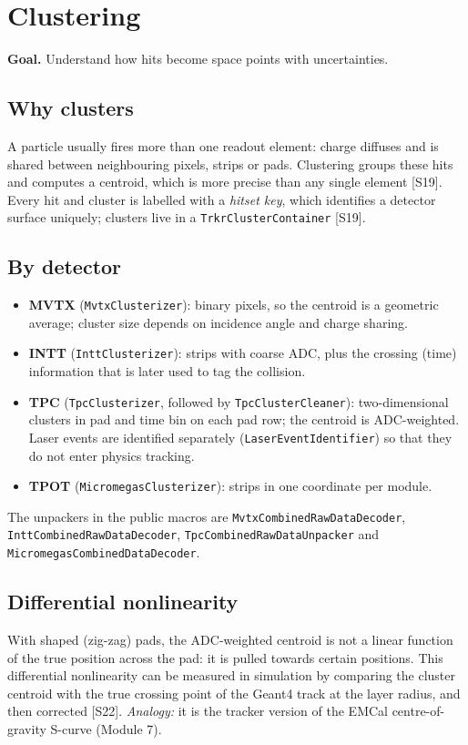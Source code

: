 \documentclass[11pt,letterpaper]{article}
\newcommand{\goal}[1]{\par\noindent\textbf{Goal.} #1\par}
\begin{document}
\section{Clustering}\label{sec:clus}
\goal{Understand how hits become space points with uncertainties.}

\subsection{Why clusters}
A particle usually fires more than one readout element: charge diffuses and is shared between neighbouring pixels, strips or pads.
Clustering groups these hits and computes a centroid, which is more precise than any single element [S19].
Every hit and cluster is labelled with a \emph{hitset key}, which identifies a detector surface uniquely; clusters live in a \texttt{TrkrClusterContainer} [S19].

\subsection{By detector}
\begin{itemize}
\item \textbf{MVTX} (\texttt{MvtxClusterizer}): binary pixels, so the centroid is a geometric average; cluster size depends on incidence angle and charge sharing.
\item \textbf{INTT} (\texttt{InttClusterizer}): strips with coarse ADC, plus the crossing (time) information that is later used to tag the collision.
\item \textbf{TPC} (\texttt{TpcClusterizer}, followed by \texttt{TpcClusterCleaner}): two-dimensional clusters in pad and time bin on each pad row; the centroid is ADC-weighted. Laser events are identified separately (\texttt{LaserEventIdentifier}) so that they do not enter physics tracking.
\item \textbf{TPOT} (\texttt{MicromegasClusterizer}): strips in one coordinate per module.
\end{itemize}
The unpackers in the public macros are \texttt{MvtxCombinedRawDataDecoder}, \texttt{InttCombinedRawDataDecoder}, \texttt{TpcCombinedRawDataUnpacker} and \texttt{MicromegasCombinedDataDecoder}.

\subsection{Differential nonlinearity}
With shaped (zig-zag) pads, the ADC-weighted centroid is not a linear function of the true position across the pad: it is pulled towards certain positions.
This differential nonlinearity can be measured in simulation by comparing the cluster centroid with the true crossing point of the Geant4 track at the layer radius, and then corrected [S22].
\emph{Analogy:} it is the tracker version of the EMCal centre-of-gravity S-curve (Module 7).
\end{document}
